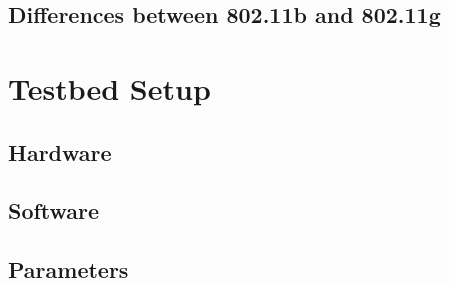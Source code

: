 \documentclass[12pt]{article}
\begin{document}
	\subsection{Differences between 802.11b and 802.11g} \label{theory:prot_differences}

\section{Testbed Setup} \label{setup}
	\subsection{Hardware} \label{setup:hardware}

	\subsection{Software} \label{setup:software}

\subsection{Parameters} \label{parameters}
\end{document}
